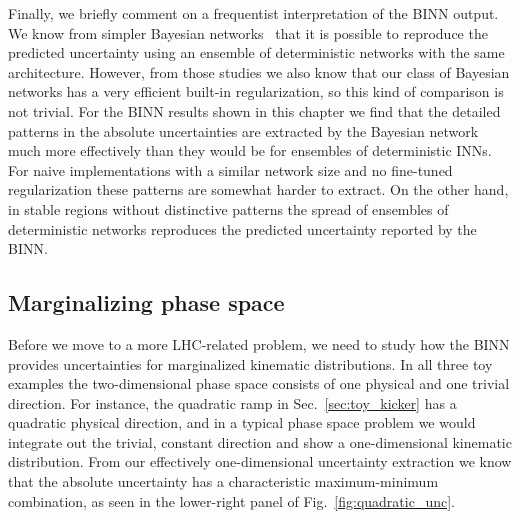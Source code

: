 Finally, we briefly comment on a frequentist interpretation of the
BINN output. We know from simpler Bayesian 
networks~\cite{Bollweg:2019skg,Kasieczka:2020vlh}
that it is possible to reproduce the predicted uncertainty using
an ensemble of deterministic networks with the same architecture.
However, from those studies we also know that our class of Bayesian
networks has a very efficient built-in regularization, so
this kind of comparison is not trivial. For the BINN results shown
in this chapter we find that the detailed patterns in the
absolute uncertainties are extracted by the Bayesian network much more
effectively than they would be for ensembles of deterministic INNs.
For naive implementations with a similar network size and no fine-tuned
regularization these patterns are somewhat harder to extract. On the
other hand, in stable regions without distinctive patterns
the spread of ensembles of deterministic networks
reproduces the predicted uncertainty reported by the BINN.

\subsection{Marginalizing phase space}
\label{sec:toy_marginal}

Before we move to a more LHC-related problem, we need to study how the
BINN provides uncertainties for marginalized kinematic
distributions. In all three toy examples the two-dimensional phase
space consists of one physical and one trivial direction. For
instance, the quadratic ramp in Sec.~\ref{sec:toy_kicker} has a quadratic
physical direction, and in a typical phase space problem we would
integrate out the trivial, constant direction and show a
one-dimensional kinematic distribution. From our effectively
one-dimensional uncertainty extraction we know that the absolute
uncertainty has a characteristic maximum-minimum combination, as seen
in the lower-right panel of Fig.~\ref{fig:quadratic_unc}.

